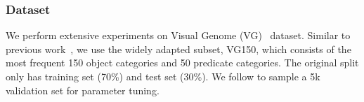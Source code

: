 \subsubsection{Dataset} 
We perform extensive experiments on Visual Genome (VG)~\cite{krishna2016visual} dataset. Similar to previous work~\cite{Xu2017,Zellers_2018_CVPR,Tang2020_unbiased}, we use the widely adapted subset, VG150, which consists of the most frequent 150 object categories and 50 predicate categories. The original split only has training set (70\%) and test set (30\%). We follow \cite{Tang2020_unbiased} to sample a 5k validation set for parameter tuning.

